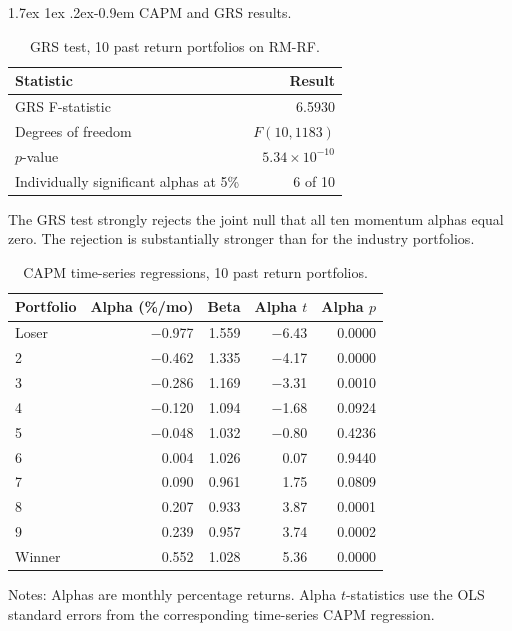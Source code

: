 \documentclass[11pt]{article}
\makeatletter
\renewcommand\paragraph{\@startsection{paragraph}{4}{0pt}%
  {1.7ex \@plus 1ex \@minus .2ex}{-0.9em}%
  {\normalfont\bfseries\normalsize\color{psink}}}
\makeatother
\begin{document}
\paragraph{CAPM and GRS results.}

\begin{table}[H]
\centering
\caption{GRS test, 10 past return portfolios on RM-RF.}
\small
\begin{tabular}{lr}
\toprule
Statistic & Result \\
\midrule
GRS F-statistic & 6.5930 \\
Degrees of freedom & $F(10, 1183)$ \\
$p$-value & $5.34\times10^{-10}$ \\
Individually significant alphas at 5\% & 6 of 10 \\
\bottomrule
\end{tabular}
\label{tab:p2e_grs}
\end{table}

The GRS test strongly rejects the joint null that all ten momentum alphas
equal zero. The rejection is substantially stronger than for the industry
portfolios.

\begin{table}[H]
\centering
\caption{CAPM time-series regressions, 10 past return portfolios.}
\small
\begin{tabular}{lrrrr}
\toprule
Portfolio & Alpha (\%/mo) & Beta & Alpha $t$ & Alpha $p$ \\
\midrule
Loser & $-$0.977 & 1.559 & $-$6.43 & 0.0000 \\
2 & $-$0.462 & 1.335 & $-$4.17 & 0.0000 \\
3 & $-$0.286 & 1.169 & $-$3.31 & 0.0010 \\
4 & $-$0.120 & 1.094 & $-$1.68 & 0.0924 \\
5 & $-$0.048 & 1.032 & $-$0.80 & 0.4236 \\
6 & 0.004 & 1.026 & 0.07 & 0.9440 \\
7 & 0.090 & 0.961 & 1.75 & 0.0809 \\
8 & 0.207 & 0.933 & 3.87 & 0.0001 \\
9 & 0.239 & 0.957 & 3.74 & 0.0002 \\
Winner & 0.552 & 1.028 & 5.36 & 0.0000 \\
\bottomrule
\end{tabular}
\label{tab:p2e_reg}
\vspace{2pt}\begin{minipage}{0.93\textwidth}\footnotesize
Notes: Alphas are monthly percentage returns. Alpha $t$-statistics use the
OLS standard errors from the corresponding time-series CAPM regression.
\end{minipage}
\end{table}
\end{document}
